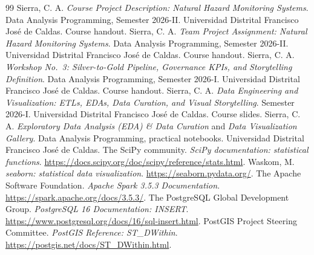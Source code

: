 \documentclass[a4paper,11pt,oneside]{book}
\begin{document}
\begin{thebibliography}{99}
 Sierra, C. A. \emph{Course Project Description: Natural Hazard Monitoring Systems}. Data Analysis Programming, Semester 2026-II. Universidad Distrital Francisco Jos\'e de Caldas. Course handout.
 Sierra, C. A. \emph{Team Project Assignment: Natural Hazard Monitoring Systems}. Data Analysis Programming, Semester 2026-II. Universidad Distrital Francisco Jos\'e de Caldas. Course handout.
 Sierra, C. A. \emph{Workshop No.~3: Silver-to-Gold Pipeline, Governance KPIs, and Storytelling Definition}. Data Analysis Programming, Semester 2026-I. Universidad Distrital Francisco Jos\'e de Caldas. Course handout.
 Sierra, C. A. \emph{Data Engineering and Visualization: ETLs, EDAs, Data Curation, and Visual Storytelling}. Semester 2026-I. Universidad Distrital Francisco Jos\'e de Caldas. Course slides.
 Sierra, C. A. \emph{Exploratory Data Analysis (EDA) \& Data Curation} and \emph{Data Visualization Gallery}. Data Analysis Programming, practical notebooks. Universidad Distrital Francisco Jos\'e de Caldas.
 The SciPy community. \emph{SciPy documentation: statistical functions}. \url{https://docs.scipy.org/doc/scipy/reference/stats.html}.
 Waskom, M. \emph{seaborn: statistical data visualization}. \url{https://seaborn.pydata.org/}.
 The Apache Software Foundation. \emph{Apache Spark 3.5.3 Documentation}. \url{https://spark.apache.org/docs/3.5.3/}.
 The PostgreSQL Global Development Group. \emph{PostgreSQL 16 Documentation: INSERT}. \url{https://www.postgresql.org/docs/16/sql-insert.html}.
 PostGIS Project Steering Committee. \emph{PostGIS Reference: ST\_DWithin}. \url{https://postgis.net/docs/ST_DWithin.html}.
\end{thebibliography}
\end{document}
